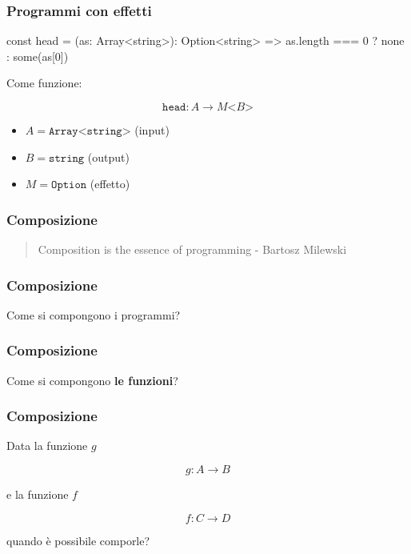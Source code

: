 \documentclass{beamer}
\newenvironment{code}
  {\vspace{0.5cm} \VerbatimEnvironment\begin{typescriptcode}}
  {\end{typescriptcode} \vspace{0.2cm}}
\begin{document}
\begin{frame}[fragile]
\frametitle{Programmi con effetti}

\begin{code}
const head = (as: Array<string>): Option<string> =>
  as.length === 0 ? none : some(as[0])
\end{code}

Come funzione:

$$
\texttt{head}: A \rightarrow M \texttt{<} B \texttt{>}
$$

\begin{itemize}
  \item $A = \texttt{Array<string>}$ (input)
  \item $B = \texttt{string}$ (output)
  \item $M = \texttt{Option}$ (effetto)
\end{itemize}

\end{frame}

\begin{frame}
\frametitle{Composizione}

\begin{quote}
Composition is the essence of programming - Bartosz Milewski
\end{quote}

\end{frame}

\begin{frame}
\frametitle{Composizione}

\centerline{Come si compongono i programmi?}

\end{frame}

\begin{frame}
\frametitle{Composizione}

\centerline{Come si compongono  \textbf{le funzioni}?}

\end{frame}

\begin{frame}
\frametitle{Composizione}

Data la funzione $g$

$$
g: A \rightarrow B
$$

e la funzione $f$

$$
f: C \rightarrow D
$$

quando è possibile comporle?

\end{frame}
\end{document}

